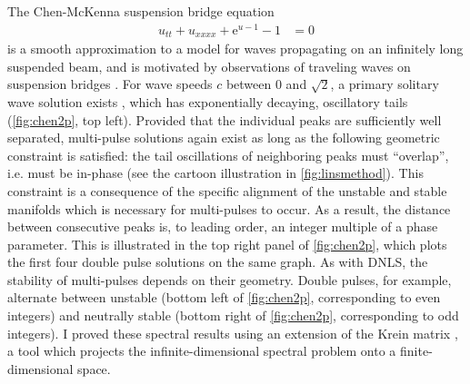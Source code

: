 \documentclass[12pt,reqno,oneside,hidelinks]{article}
\begin{document}
The Chen-McKenna suspension bridge equation 
\begin{align*}
    u_{tt} + u_{xxxx} + \mathrm{e}^{u-1} - 1 &= 0 
\end{align*}
is a smooth approximation to a model for waves propagating on an infinitely long suspended beam, and is motivated by observations of traveling waves on suspension bridges \cite{McKenna1990,Chen1997}. For wave speeds $c$ between 0 and $\sqrt{2}$, a primary solitary wave solution exists \cite{Berg2018}, which has exponentially decaying, oscillatory tails (\cref{fig:chen2p}, top left). Provided that the individual peaks are sufficiently well separated, multi-pulse solutions again exist as long as the following geometric constraint is satisfied: the tail oscillations of neighboring peaks must ``overlap'', i.e. must be in-phase (see the cartoon illustration in \cref{fig:linsmethod}). This constraint is a consequence of the specific alignment of the unstable and stable manifolds which is necessary for multi-pulses to occur. As a result, the distance between consecutive peaks is, to leading order, an integer multiple of a phase parameter. This is illustrated in the top right panel of \cref{fig:chen2p}, which plots the first four double pulse solutions on the same graph. As with DNLS, the stability of multi-pulses depends on their geometry. Double pulses, for example, alternate between unstable (bottom left of \cref{fig:chen2p}, corresponding to even integers) and neutrally stable (bottom right of \cref{fig:chen2p}, corresponding to odd integers). I proved these spectral results using an extension of the Krein matrix \cite{Kapitula2020}, a tool which projects the infinite-dimensional spectral problem onto a finite-dimensional space. 
\end{document}
